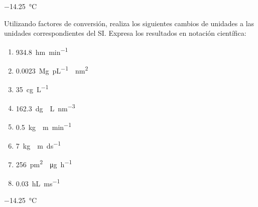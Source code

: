 \begin{solution}
  \SI{-14,25}{\celsius}
\end{solution}




\begin{exercise}[
    tags    = {unidades, factores de conversión, conversión, 2 unidades},
    topics  = {unidades, medida, física, química},
    source  = {MERES},
  ]
  Utilizando factores de conversión, realiza los siguientes cambios de unidades a las unidades correspondientes del SI. Expresa los resultados en notación científica:
  \begin{multicols}{2}
    \begin{enumerate}
      \item \SI{934.8}{\hecto\m\per\minute}
      \item \SI{0.0023}{\mega\g\per\pico\L\cdot\square\nm}
      \item \SI{35}{\centi\g\per\L}
      \item \SI{162.3}{\deci\g\cdot\L\per\cubic\nm}
      \item \SI{0.5}{\kg\cdot\m\per\minute}
      \item \SI{7}{\kg\cdot\m\per\deci\s}
      \item \SI{256}{\square\pm\cdot\ug\per\hour}
      \item \SI{0.03}{\hL\per\ms}
    \end{enumerate}
  \end{multicols}
\end{exercise}

\begin{solution}
  \SI{-14,25}{\celsius}
\end{solution}
